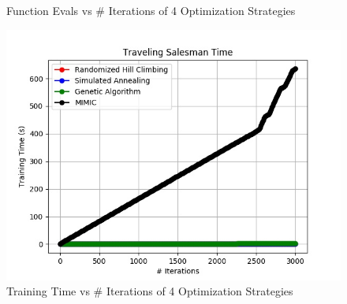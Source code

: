 \documentclass[h]{article}
\begin{document}
\begin{figure}[H]
      \caption*{Function Evals vs # Iterations of 4 Optimization Strategies} 
   \endminipage\hfill
      \includegraphics[width=1\textwidth,keepaspectratio]{traveling_salesman_time.jpg} 
      \caption*{Training Time vs # Iterations of 4 Optimization Strategies} 
   \endminipage\hfill
\end{figure}
\end{document}
